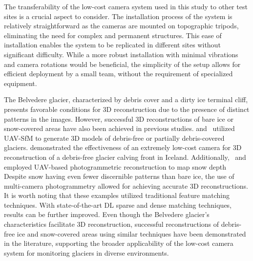 The transferability of the low-cost camera system used in this study to other test sites
is a crucial aspect to consider.
The installation process of the system is relatively straightforward as the cameras are
mounted on topographic tripods, eliminating the need for complex and permanent
structures.
This ease of installation enables the system to be replicated in different sites without
significant difficulty.
While a more robust installation with minimal vibrations and camera rotations would be
beneficial, the simplicity of the setup allows for efficient deployment by a small team,
without the requirement of specialized equipment.

The Belvedere glacier, characterized by debris cover and a dirty ice terminal cliff,
presents favorable conditions for 3D reconstruction due to the presence of distinct
patterns in the images.
However, successful 3D reconstructions of bare ice or snow-covered areas have also been
achieved in previous studies.
\cite{belloni2023} and~\cite{Gindraux2017} utilized UAV-SfM to generate 3D models
of debris-free or partially debris-covered glaciers.
\cite{Taylor2023} demonstrated the effectiveness of an extremely low-cost camera for 3D
reconstruction of a debris-free glacier calving front in Iceland.
Additionally,~\cite{Avanzi2018} and~\cite{DeMichele2016} employed UAV-based
photogrammetric reconstruction to map snow depth Despite snow having even fewer
discernible patterns than bare ice, the use of multi-camera photogrammetry allowed for
achieving accurate 3D reconstructions.
It is worth noting that these examples utilized traditional feature matching techniques.
With state-of-the-art DL sparse and dense matching techniques, results can be further
improved.
Even though the Belvedere glacier's characteristics facilitate 3D reconstruction,
successful reconstructions of debris-free ice and snow-covered areas using similar
techniques have been demonstrated in the literature, supporting the broader applicability
of the low-cost camera system for monitoring glaciers in diverse environments.

\makechapterbibliography{}
